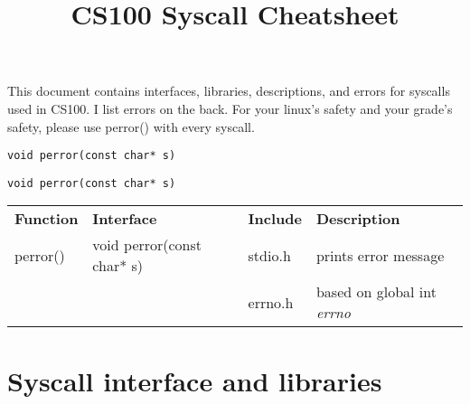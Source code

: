\documentclass{article}
\title{CS100 Syscall Cheatsheet}
\author{}
\date{}
\begin{document}
\maketitle

\large This document contains interfaces, libraries, descriptions, and errors for 
syscalls used in CS100. I list errors on the back. For your linux's safety and 
your grade's safety, please use perror() with every syscall.

\smallskip
\begin{lstlisting}
void perror(const char* s)
\end{lstlisting}
\verb,void perror(const char* s),


\medskip
\begin{tabular}{llll}
    \bf Function & \bf Interface & \bf Include & \bf Description\\
    perror() & void perror(const char* s) &  stdio.h &  prints error message\\
    && errno.h & based on global int \it errno \rm
\end{tabular}
\normalsize

\section{Syscall interface and libraries}
\end{document}
